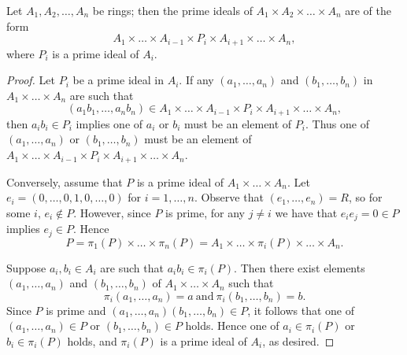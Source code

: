 \documentclass[10pt]{amsart}
\begin{document}
\begin{thm}
  Let $A_1, A_2, \ldots, A_n$ be rings; then the prime ideals of $A_1 \times A_2 \times \ldots \times A_n$ are of the form
  $$A_1 \times \ldots \times A_{i-1} \times P_i \times A_{i+1} \times \ldots \times A_n,$$
  where $P_i$ is a prime ideal of $A_i$.

  \begin{proof}
    Let $P_i$ be a prime ideal in $A_i$.
    If any $(a_1, \ldots, a_n)$ and $(b_1, \ldots, b_n)$ in $A_1 \times \ldots \times A_n$ are such that
    $$(a_1b_1, \ldots, a_nb_n) \in A_1 \times \ldots \times A_{i-1} \times P_i \times A_{i+1} \times \ldots \times A_n,$$
    then $a_ib_i \in P_i$ implies one of $a_i$ or $b_i$ must be an element of $P_i$.
    Thus one of $(a_1, \ldots, a_n)$ or $(b_1, \ldots, b_n)$ must be an element of $A_1 \times \ldots \times A_{i-1} \times P_i \times A_{i+1} \times \ldots \times A_n$.
    
    Conversely, assume that $P$ is a prime ideal of $A_1 \times \ldots \times A_n$.
    Let $e_i = (0, \ldots, 0, 1, 0, \ldots, 0)$ for $i = 1, \ldots, n$.
    Observe that $(e_1, \ldots, e_n) = R$, so for some $i$, $e_i \not \in P$.
    However, since $P$ is prime, for any $j \neq i$ we have that $e_ie_j = 0 \in P$ implies $e_j \in P$.
    Hence 
    $$P = \pi_1(P) \times \ldots \times \pi_n(P) = A_1 \times \ldots \times \pi_i(P) \times \ldots \times A_n.$$
    
    Suppose $a_i, b_i \in A_i$ are such that $a_ib_i \in \pi_i(P)$.
    Then there exist elements $(a_1, \ldots, a_n)$ and $(b_1, \ldots, b_n)$ of $A_1 \times \ldots \times A_n$ such that
    $$\pi_i(a_1, \ldots, a_n) = a\ \text{and}\ \pi_i(b_1, \ldots, b_n) = b.$$
    Since $P$ is prime and $(a_1, \ldots, a_n)(b_1, \ldots, b_n) \in P$, it follows that one of $(a_1, \ldots, a_n) \in P$ or $(b_1, \ldots, b_n) \in P$ holds.
    Hence one of $a_i \in \pi_i(P)$ or $b_i \in \pi_i(P)$ holds, and $\pi_i(P)$ is a prime ideal of $A_i$, as desired.
  \end{proof}
\end{thm}
\end{document}
